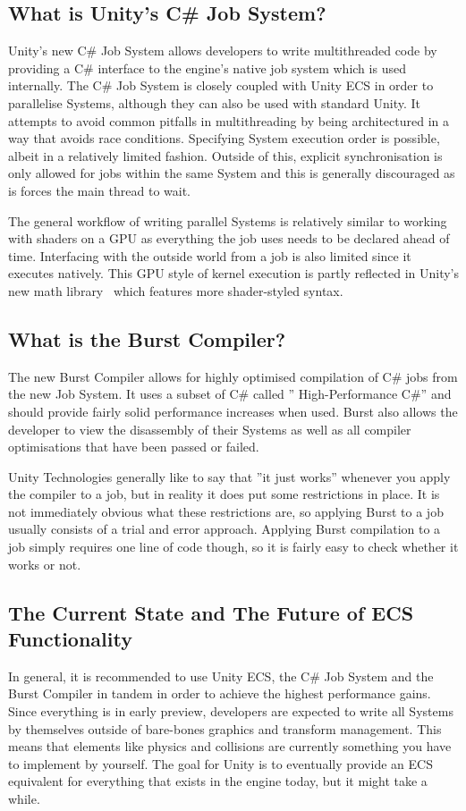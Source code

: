 \subsection{What is Unity's C\# Job System?}
Unity's new C\# Job System allows developers to write multithreaded code by providing a C\# interface to the engine's native job system which is used internally. The C\# Job System is closely coupled with Unity ECS in order to parallelise Systems, although they can also be used with standard Unity. It attempts to avoid common pitfalls in multithreading by being architectured in a way that avoids race conditions. Specifying System execution order is possible, albeit in a relatively limited fashion. Outside of this, explicit synchronisation is only allowed for jobs within the same System and this is generally discouraged as is forces the main thread to wait. 

The general workflow of writing parallel Systems is relatively similar to working with shaders on a GPU as everything the job uses needs to be declared ahead of time. Interfacing with the outside world from a job is also limited since it executes natively. This GPU style of kernel execution is partly reflected in Unity's new math library~\cite{unitymath} which features more shader-styled syntax. 

\subsection{What is the Burst Compiler?}
The new Burst Compiler allows for highly optimised compilation of C\# jobs from the new Job System. It uses a subset of C\# called '' High-Performance C\#'' and should provide fairly solid performance increases when used. Burst also allows the developer to view the disassembly of their Systems as well as all compiler optimisations that have been passed or failed.

Unity Technologies generally like to say that ''it just works'' whenever you apply the compiler to a job, but in reality it does put some restrictions in place. It is not immediately obvious what these restrictions are, so applying Burst to a job usually consists of a trial and error approach. Applying Burst compilation to a job simply requires one line of code though, so it is fairly easy to check whether it works or not.  

\subsection{The Current State and The Future of ECS Functionality}
In general, it is recommended to use Unity ECS, the C\# Job System and the Burst Compiler in tandem in order to achieve the highest performance gains. Since everything is in early preview, developers are expected to write all Systems by themselves outside of bare-bones graphics and transform management. This means that elements like physics and collisions are currently something you have to implement by yourself. The goal for Unity is to eventually provide an ECS equivalent for everything that exists in the engine today, but it might take a while. 

